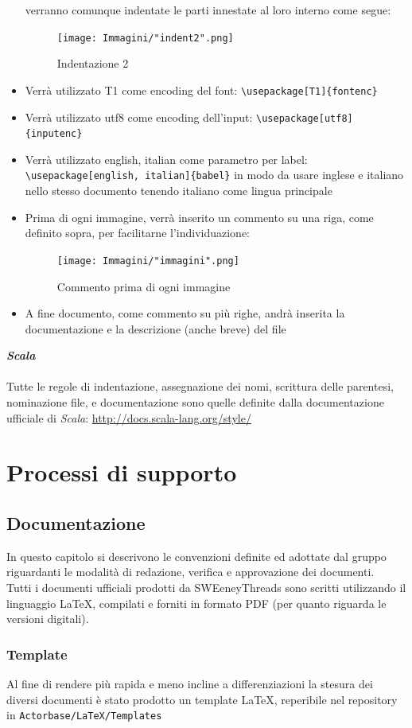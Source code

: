 \documentclass[a4paper]{report}
\newcommand{\mychapter}[2]{
	\setcounter{chapter}{#1}
	\setcounter{section}{0}
	\setcounter{subsection}{1}
	\chapter*{#2}
	\addcontentsline{toc}{chapter}{#2}
}
\begin{document}
\begin{itemize}
		verranno comunque indentate le parti innestate al loro interno come segue:
		\begin{figure}[h!]
			\centering
			\texttt{[image: Immagini/"indent2".png]}
			\caption{Indentazione 2}
		\end{figure}
		\item Verrà utilizzato T1 come encoding del font: \verb|\usepackage[T1]{fontenc}|
		\item Verrà utilizzato utf8 come encoding dell'input: \verb|\usepackage[utf8]{inputenc}|
		\item Verrà utilizzato english, italian come parametro per label: \verb|\usepackage[english, italian]{babel}| in modo da 
		usare inglese e italiano nello stesso documento tenendo italiano come lingua principale
		\item Prima di ogni immagine, verrà inserito un commento su una riga, come definito sopra, per facilitarne l'individuazione:
		\begin{figure}[h!]
			\centering
			\texttt{[image: Immagini/"immagini".png]}
			\caption{Commento prima di ogni immagine}
		\end{figure}
		\item A fine documento, come commento su più righe, andrà inserita la documentazione e la descrizione (anche breve) del file
	\end{itemize}
	\textbf{\emph{Scala}} \\ \\ 
	Tutte le regole di indentazione, assegnazione dei nomi, scrittura delle parentesi, nominazione file, e documentazione sono quelle
	definite dalla documentazione ufficiale di \emph{Scala}: \url{http://docs.scala-lang.org/style/}
	\mychapter{3}{Processi di supporto}
	\section{Documentazione} %
	In questo capitolo si descrivono le convenzioni definite ed adottate dal gruppo riguardanti le 
	modalità di redazione, verifica e approvazione dei documenti. \\
	Tutti i documenti ufficiali prodotti da SWEeneyThreads sono scritti utilizzando il linguaggio \LaTeX{}, compilati e
	forniti in formato PDF (per quanto riguarda le versioni digitali).
	\subsection{Template}
	Al fine di rendere più rapida e meno incline a differenziazioni la stesura dei diversi documenti è stato prodotto un
	template \LaTeX, reperibile nel repository in \verb|Actorbase/LaTeX/Templates| %
\end{document}
